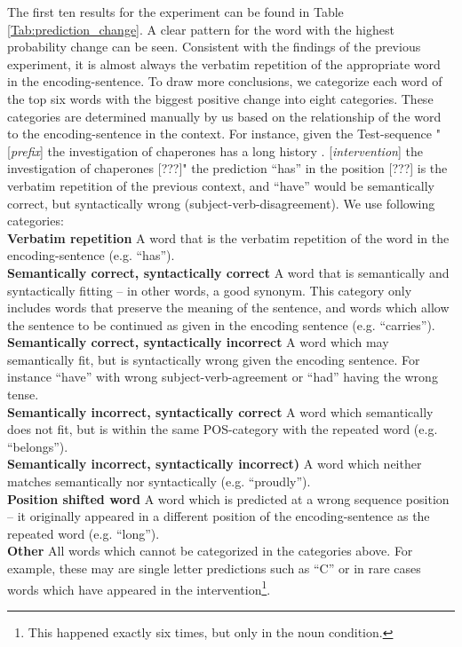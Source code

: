 The first ten results for the experiment can be found in Table \ref{Tab:prediction_change}.
A clear pattern for the word with the highest probability change can be seen. Consistent with the findings of the previous experiment, it is almost always the verbatim repetition of the appropriate word in the encoding-sentence.
To draw more conclusions, we categorize each word of the top six words with the biggest positive change into eight categories.
These categories are determined manually by us based on the relationship of the word to the encoding-sentence in the context.
For instance, given the Test-sequence "[\textit{prefix}] the investigation of chaperones has a long history . [\textit{intervention}] the investigation of chaperones [???]" the prediction ``has'' in the position [???] is the verbatim repetition of the previous context, and ``have'' would be semantically correct, but syntactically wrong (subject-verb-disagreement).
We use following categories:\\
\textbf{Verbatim repetition}
A word that is the verbatim repetition of the word in the encoding-sentence (e.g. ``has'').\\
\textbf{Semantically correct, syntactically correct}
A word that is semantically and syntactically fitting -- in other words, a good synonym.
This category only includes words that preserve the meaning of the sentence, and words which allow the sentence to be continued as given in the encoding sentence (e.g. ``carries'').\\
\textbf{Semantically correct, syntactically incorrect}
A word which may semantically fit, but is syntactically wrong given the encoding sentence. For instance ``have'' with wrong subject-verb-agreement or ``had'' having the wrong tense.\\
\textbf{Semantically incorrect, syntactically correct}
A word which semantically does not fit, but is within the same POS-category with the repeated word (e.g. ``belongs'').\\
\textbf{Semantically incorrect, syntactically incorrect)}
A word which neither matches semantically nor syntactically (e.g. ``proudly'').\\
\textbf{Position shifted word}
A word which is predicted at a wrong sequence position -- it originally appeared in a different position of the encoding-sentence as the repeated word (e.g. ``long'').\\
\textbf{Other}
All words which cannot be categorized in the categories above.
For example, these may are single letter predictions such as ``C'' or in rare cases words which have appeared in the intervention\footnote{This happened exactly six times, but only in the noun condition.}.\\

